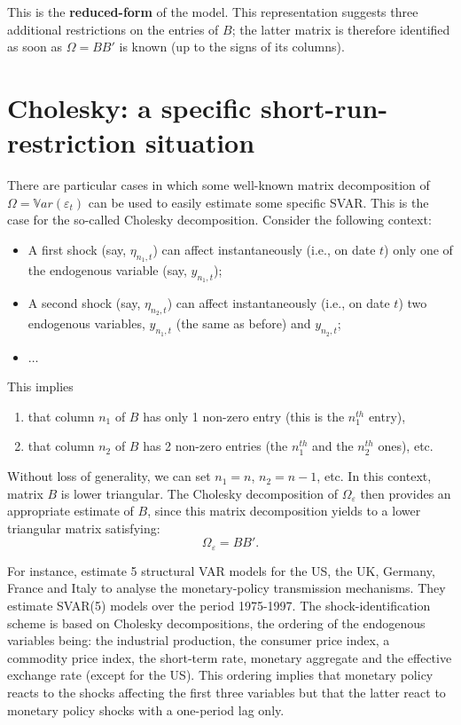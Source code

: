 \documentclass[
  12pt,
]{book}
\providecommand{\tightlist}{%
  \setlength{\itemsep}{0pt}\setlength{\parskip}{0pt}}
\theoremstyle{definition}
\theoremstyle{definition}
\theoremstyle{definition}
\theoremstyle{definition}
\theoremstyle{remark}
\begin{document}
This is the \textbf{reduced-form} of the model. This representation suggests three additional restrictions on the entries of \(B\); the latter matrix is therefore identified as soon as \(\Omega = BB'\) is known (up to the signs of its columns).

\hypertarget{cholesky-a-specific-short-run-restriction-situation}{%
\section{Cholesky: a specific short-run-restriction situation}\label{cholesky-a-specific-short-run-restriction-situation}}

There are particular cases in which some well-known matrix decomposition of \(\Omega=\mathbb{V}ar(\varepsilon_t)\) can be used to easily estimate some specific SVAR. This is the case for the so-called Cholesky decomposition. Consider the following context:

\begin{itemize}
\tightlist
\item
  A first shock (say, \(\eta_{n_1,t}\)) can affect instantaneously
  (i.e., on date \(t\)) only one of the endogenous variable (say, \(y_{n_1,t}\));
\item
  A second shock (say, \(\eta_{n_2,t}\)) can affect instantaneously
  (i.e., on date \(t\)) two endogenous variables, \(y_{n_1,t}\) (the same as before) and \(y_{n_2,t}\);
\item
  \(\dots\)
\end{itemize}

This implies

\begin{enumerate}
\def\labelenumi{\arabic{enumi}.}
\tightlist
\item
  that column \(n_1\) of \(B\) has only 1 non-zero entry (this is the \(n_1^{th}\) entry),
\item
  that column \(n_2\) of \(B\) has 2 non-zero entries (the \(n_1^{th}\) and the \(n_2^{th}\) ones), etc.
\end{enumerate}

Without loss of generality, we can set \(n_1=n\), \(n_2=n-1\), etc. In this context, matrix \(B\) is lower triangular. The Cholesky decomposition of \(\Omega_{\varepsilon}\) then provides an appropriate estimate of \(B\), since this matrix decomposition yields to a lower triangular matrix satisfying:
\[
\Omega_\varepsilon = BB'.
\]

For instance, \citet{DEDOLA20051543} estimate 5 structural VAR models for the US, the UK, Germany, France and Italy to analyse the monetary-policy transmission mechanisms. They estimate SVAR(5) models over the period 1975-1997. The shock-identification scheme is based on Cholesky decompositions, the ordering of the endogenous variables being: the industrial production, the consumer price index, a commodity price index, the short-term rate, monetary aggregate and the effective exchange rate (except for the US). This ordering implies that monetary policy reacts to the shocks affecting the first three variables but that the latter react to monetary policy shocks with a one-period lag only.
\end{document}
